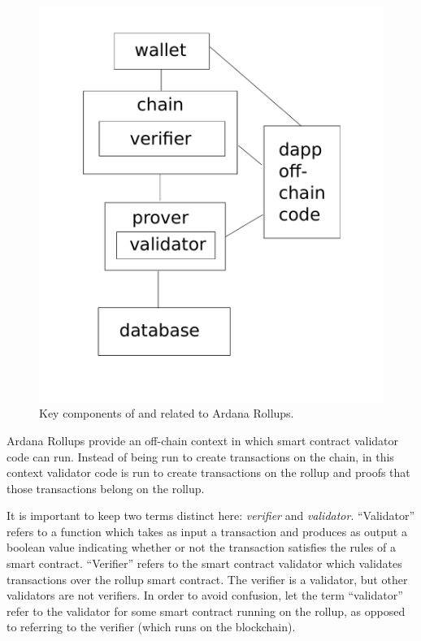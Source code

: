 \documentclass[12pt]{article}
\begin{document}
\begin{figure}
	\includegraphics[width=1.0\columnwidth]{system-diagram.pdf}
	\caption{Key components of and related to Ardana Rollups.}
	\label{fig:system-diagram}
\end{figure}

Ardana Rollups provide an off-chain context in which smart contract validator code can run. Instead of being run to create transactions on the chain, in this context validator code is run to create transactions on the rollup and proofs that those transactions belong on the rollup.

It is important to keep two terms distinct here: \emph{verifier}\/ and \emph{validator}. ``Validator'' refers to a function which takes as input a transaction and produces as output a boolean value indicating whether or not the transaction satisfies the rules of a smart contract. ``Verifier'' refers to the smart contract validator which validates transactions over the rollup smart contract. The verifier is a validator, but other validators are not verifiers. In order to avoid confusion, let the term ``validator'' refer to the validator for some smart contract running on the rollup, as opposed to referring to the verifier (which runs on the blockchain).
\end{document}
